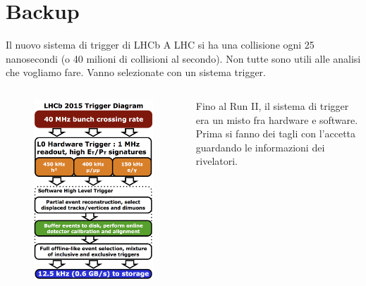 \documentclass[
10pt,
aspectratio=169,
]{beamer}
\begin{document}
\section*{Backup}
\begin{frame}{Il nuovo sistema di trigger di LHCb}
A LHC si ha una collisione ogni 25 nanosecondi (o 40 milioni di collisioni al secondo). Non tutte sono utili alle analisi che vogliamo fare. Vanno selezionate con un sistema trigger.
\begin{columns}
    \begin{figure}
        \centering
        \includegraphics[width=0.9\linewidth]{LHCb_Trigger_RunII_May2015.jpeg}
    \end{figure}
    \small
    Fino al Run II, il sistema di trigger era un misto fra hardware e software. Prima si fanno dei tagli con l'accetta guardando le informazioni dei rivelatori.
    

\end{columns}
\end{frame}
\end{document}
